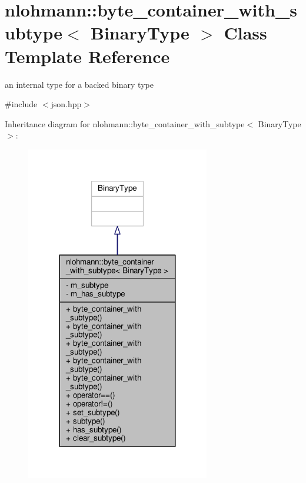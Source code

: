 \hypertarget{classnlohmann_1_1byte__container__with__subtype}{}\section{nlohmann\+:\+:byte\+\_\+container\+\_\+with\+\_\+subtype$<$ Binary\+Type $>$ Class Template Reference}
\label{classnlohmann_1_1byte__container__with__subtype}


an internal type for a backed binary type  




{\ttfamily \#include $<$json.\+hpp$>$}



Inheritance diagram for nlohmann\+:\+:byte\+\_\+container\+\_\+with\+\_\+subtype$<$ Binary\+Type $>$\+:
\nopagebreak
\begin{figure}[H]
\begin{center}
\leavevmode
\includegraphics[width=227pt]{classnlohmann_1_1byte__container__with__subtype__inherit__graph}
\end{center}
\end{figure}


